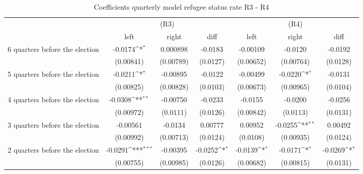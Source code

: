 \begin{table}[!ht]\centering \footnotesize
\def\sym#1{\ifmmode^{#1}\else\(^{#1}\)\fi}
\caption{Coefficients quarterly model refugee status rate R3 - R4}
\begin{tabular}{l*{6}{c}}
\hline\hline
                    &\multicolumn{3}{c}{(R3)}&\multicolumn{3}{c}{(R4)}\\
&\multicolumn{1}{c}{left}&\multicolumn{1}{c}{right}&\multicolumn{1}{c}{diff}&\multicolumn{1}{c}{left}&\multicolumn{1}{c}{right}&\multicolumn{1}{c}{diff}\\
\hline
 6 quarters before the election&     -0.0174\sym{*}  &    0.000898         &     -0.0183         &    -0.00109         &     -0.0120         &     -0.0192         \\
                    &   (0.00841)         &   (0.00789)         &    (0.0127)         &   (0.00652)         &   (0.00764)         &    (0.0128)         \\
[0,5em]
 5 quarters before the election&     -0.0211\sym{*}  &    -0.00895         &     -0.0122         &    -0.00499         &     -0.0220\sym{*}  &     -0.0131         \\
                    &   (0.00825)         &   (0.00828)         &    (0.0103)         &   (0.00673)         &   (0.00965)         &    (0.0104)         \\
[0,5em]
 4 quarters before the election&     -0.0308\sym{**} &    -0.00750         &     -0.0233         &     -0.0155         &     -0.0200         &     -0.0256         \\
                    &   (0.00972)         &    (0.0111)         &    (0.0126)         &   (0.00842)         &    (0.0113)         &    (0.0131)         \\
[0,5em]
 3 quarters before the election&    -0.00561         &     -0.0134         &     0.00777         &     0.00952         &     -0.0255\sym{**} &     0.00492         \\
                    &   (0.00992)         &   (0.00713)         &    (0.0124)         &    (0.0108)         &   (0.00935)         &    (0.0124)         \\
[0,5em]
 2 quarters before the election&     -0.0291\sym{***}&    -0.00395         &     -0.0252\sym{*}  &     -0.0139\sym{*}  &     -0.0171\sym{*}  &     -0.0269\sym{*}  \\
                    &   (0.00755)         &   (0.00985)         &    (0.0126)         &   (0.00682)         &   (0.00815)         &    (0.0131)         \\

\end{tabular}
\end{table}
